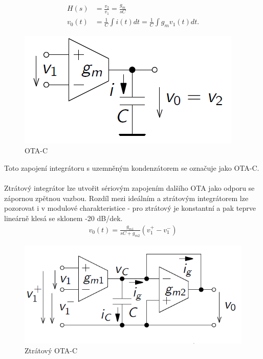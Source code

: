 \documentclass[twoside]{article}
\begin{document}
\begin{align}
H(s) &= \frac{v_2}{v_1} = \frac{g_m}{sC} \\
v_0(t) &= \frac{1}{C}\int i(t)dt = \frac{1}{C}\int g_mv_1(t)dt.
\end{align}
\begin{figure}[H]
\centering
\includegraphics[scale=0.55]{otaintegrator.png}
\caption{OTA-C \cite{4}}
\end{figure}
\noindent Toto zapojení integrátoru s uzemněným kondenzátorem se označuje jako OTA-C.\\
\\
Ztrátový integrátor lze utvořit sériovým zapojením dalšího OTA jako odporu se zápornou zpětnou vazbou. Rozdíl mezi ideálním a ztrátovým integrátorem lze pozorovat i v modulové charakteristice - pro ztrátový je konstantní a pak teprve lineárně klesá se sklonem -20 dB/dek.
\begin{align}
v_0(t) = \frac{g_{m1}}{sC + g_{m2}}(v_1^+ - v_{1}^-)
\end{align}
\begin{figure}[H]
\centering
\includegraphics[scale=0.55]{damp.png}
\caption{Ztrátový OTA-C \cite{4}}
\end{figure}
\end{document}
